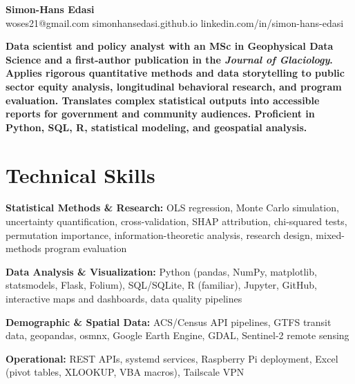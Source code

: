 \documentclass[11pt,a4paper]{article}
\begin{document}
\noindent{}

\begin{center}
    {\LARGE \textbf{Simon-Hans Edasi}} \\[6pt]
    woses21@gmail.com \hfill \textbar \hfill
    simonhansedasi.github.io \hfill \textbar \hfill
    linkedin.com/in/simon-hans-edasi
\end{center}

\vspace{0.3cm}

\noindent
\textbf{Data scientist and policy analyst with an MSc in Geophysical Data Science and a first-author publication in the \textit{Journal of Glaciology}. Applies rigorous quantitative methods and data storytelling to public sector equity analysis, longitudinal behavioral research, and program evaluation. Translates complex statistical outputs into accessible reports for government and community audiences. Proficient in Python, SQL, R, statistical modeling, and geospatial analysis.}

\section*{Technical Skills}

\noindent
\textbf{Statistical Methods \& Research:} OLS regression, Monte Carlo simulation, uncertainty quantification, cross-validation, SHAP attribution, chi-squared tests, permutation importance, information-theoretic analysis, research design, mixed-methods program evaluation

\noindent
\textbf{Data Analysis \& Visualization:} Python (pandas, NumPy, matplotlib, statsmodels, Flask, Folium), SQL/SQLite, R (familiar), Jupyter, GitHub, interactive maps and dashboards, data quality pipelines

\noindent
\textbf{Demographic \& Spatial Data:} ACS/Census API pipelines, GTFS transit data, geopandas, osmnx, Google Earth Engine, GDAL, Sentinel-2 remote sensing

\noindent
\textbf{Operational:} REST APIs, systemd services, Raspberry Pi deployment, Excel (pivot tables, XLOOKUP, VBA macros), Tailscale VPN
\end{document}
